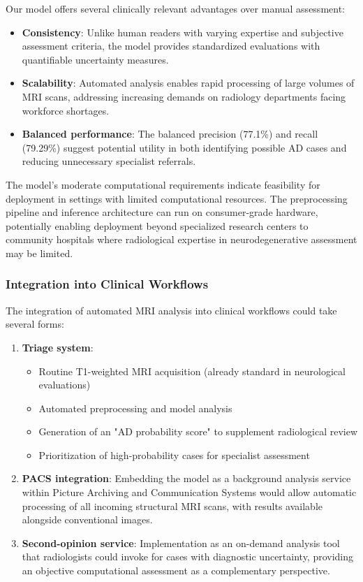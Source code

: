 \documentclass[12pt, a4paper]{article}
\begin{document}
Our model offers several clinically relevant advantages over manual assessment:

\begin{itemize}
    \item \textbf{Consistency}: Unlike human readers with varying expertise and subjective assessment criteria, the model provides standardized evaluations with quantifiable uncertainty measures.
    
    \item \textbf{Scalability}: Automated analysis enables rapid processing of large volumes of MRI scans, addressing increasing demands on radiology departments facing workforce shortages.
    
    \item \textbf{Balanced performance}: The balanced precision (77.1\%) and recall (79.29\%) suggest potential utility in both identifying possible AD cases and reducing unnecessary specialist referrals.
\end{itemize}

The model's moderate computational requirements indicate feasibility for deployment in settings with limited computational resources. The preprocessing pipeline and inference architecture can run on consumer-grade hardware, potentially enabling deployment beyond specialized research centers to community hospitals where radiological expertise in neurodegenerative assessment may be limited.

\subsubsection{Integration into Clinical Workflows}

The integration of automated MRI analysis into clinical workflows could take several forms:

\begin{enumerate}
    \item \textbf{Triage system}: 
    \begin{itemize}
        \item Routine T1-weighted MRI acquisition (already standard in neurological evaluations)
        \item Automated preprocessing and model analysis
        \item Generation of an "AD probability score" to supplement radiological review
        \item Prioritization of high-probability cases for specialist assessment
    \end{itemize}
    
    \item \textbf{PACS integration}: Embedding the model as a background analysis service within Picture Archiving and Communication Systems would allow automatic processing of all incoming structural MRI scans, with results available alongside conventional images.
    
    \item \textbf{Second-opinion service}: Implementation as an on-demand analysis tool that radiologists could invoke for cases with diagnostic uncertainty, providing an objective computational assessment as a complementary perspective.
\end{enumerate}
\end{document}

